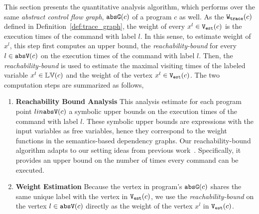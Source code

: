 This section presents the quantitative analysis algorithm, which performs over the same \emph{abstract control flow graph}, $\mathtt{abs}{\mathtt{G}}(c)$ of a program $c$ as well. 
As the $\mathtt{{W_{trace}}}(c)$ defined in Definition~\ref{def:trace_graph}, the weight of every $x^l \in \mathtt{{V_{est}}}(c)$ is
the execution times of the command with label $l$. 
In this sense, to estimate weight of $x^l$, this step first computes an upper bound, the \emph{reachability-bound}\cite{GulwaniZ10} for every $l \in \mathtt{abs}{\mathtt{V}}(c)$
on the execution times of the command with label $l$. 
Then, the \emph{reachability-bound} is used to estimate the maximal visiting times of the labeled variable $x^l \in \mathbb{LV}(c)$
and 
the weight of the vertex $x^l \in \mathtt{{V_{est}}}(c)$.
The two computation steps are summarized as follows,
\begin{enumerate}
  \item \textbf{Reachability Bound Analysis}
  This analysis estimate for each program point $l in \mathtt{abs}{\mathtt{V}}(c)$ a symbolic upper bounds on the execution times of the command with label $l$. 
  These symbolic upper bounds are expressions with the input variables as free variables, hence they correspond to the weight functions in the semantics-based dependency graphs. 
  Our reachability-bound algorithm adapts to our setting ideas from previous work~\cite{ZulegerGSV11,SinnZV14,sinn2017complexity}.
  Specifically, it provides an upper bound on the number of times every command can be executed.
    \item \textbf{Weight Estimation}
    Because
    the vertex in program's $\mathtt{abs}{\mathtt{G}}(c)$ shares the same unique label with the vertex in $\mathtt{{V_{est}}}(c)$, 
    we use the \emph{reachability-bound} on the vertex $l \in \mathtt{abs}{\mathtt{V}}(c)$ directly as the weight of the vertex $x^l$ in $\mathtt{{V_{est}}}(c)$.
\end{enumerate}

